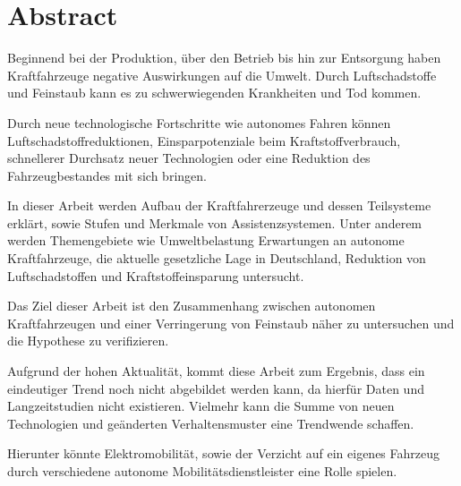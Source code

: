 \chapter*{Abstract}
Beginnend bei der Produktion, über den Betrieb bis hin zur Entsorgung haben Kraftfahrzeuge
negative Auswirkungen auf die Umwelt.
Durch Luftschadstoffe und Feinstaub kann es zu schwerwiegenden Krankheiten und Tod kommen.


Durch neue technologische Fortschritte wie autonomes Fahren können
Luftschadstoffreduktionen,
Einsparpotenziale beim Kraftstoffverbrauch,
schnellerer Durchsatz neuer Technologien
oder eine Reduktion des Fahrzeugbestandes mit sich bringen.


In dieser Arbeit werden Aufbau der Kraftfahrerzeuge und dessen Teilsysteme erklärt, sowie
Stufen und Merkmale von Assistenzsystemen.
Unter anderem werden Themengebiete wie Umweltbelastung
Erwartungen an autonome Kraftfahrzeuge,
die aktuelle gesetzliche Lage in Deutschland, Reduktion von Luftschadstoffen und Kraftstoffeinsparung
untersucht.


Das Ziel dieser Arbeit ist den Zusammenhang zwischen
autonomen Kraftfahrzeugen und einer Verringerung von Feinstaub näher zu untersuchen und
die Hypothese zu verifizieren.

Aufgrund der hohen Aktualität, kommt diese Arbeit zum Ergebnis,
dass ein eindeutiger Trend noch nicht abgebildet werden kann,
da hierfür Daten und Langzeitstudien nicht existieren.
Vielmehr kann die Summe von neuen Technologien und geänderten Verhaltensmuster eine Trendwende schaffen.

Hierunter könnte Elektromobilität, sowie der Verzicht auf ein eigenes Fahrzeug durch verschiedene
autonome Mobilitätsdienstleister eine Rolle spielen.